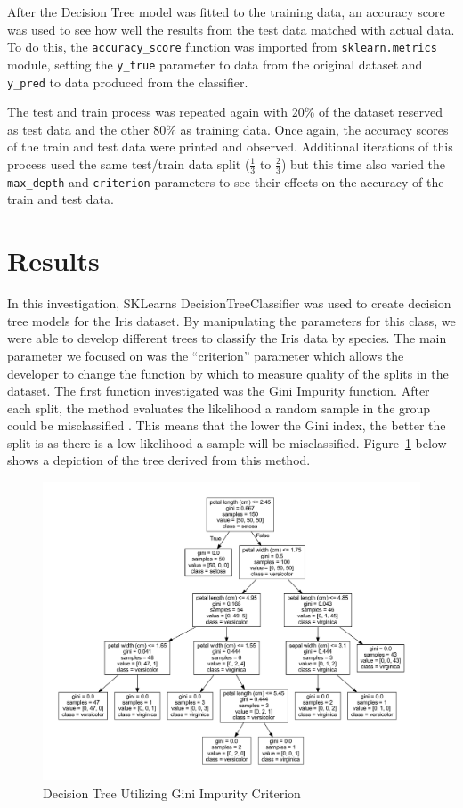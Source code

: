 \documentclass[journal]{IEEEtran}
\begin{document}
After the Decision Tree model was fitted to the training data, an accuracy score was used to see how well the results from the test data matched with actual data. To do this, the \lstinline{accuracy_score} function was imported from \lstinline{sklearn.metrics} module, setting the \lstinline{y_true} parameter to data from the original dataset and \lstinline{y_pred} to data produced from the classifier. 

The test and train process was repeated again with 20\% of the dataset reserved as test data and the other 80\% as training data. Once again, the accuracy scores of the train and test data were printed and observed. Additional iterations of this process used the same test/train data split (\(\frac{1}{3}\) to \(\frac{2}{3}\)) but this time also varied the \lstinline{max_depth} and \lstinline{criterion} parameters to see their effects on the accuracy of the train and test data.

\section{Results}

In this investigation, SKLearn\textquotesingle s DecisionTreeClassifier was used to create decision tree models for the Iris dataset. By manipulating the parameters for this class, we were able to develop different trees to classify the Iris data by species. The main parameter we focused on was the “criterion” parameter which allows the developer to change the function by which to measure quality of the splits in the dataset. The first function investigated was the Gini Impurity function. After each split, the method evaluates the likelihood a random sample in the group could be misclassified \cite{b2}. This means that the lower the Gini index, the better the split is as there is a low likelihood a sample will be misclassified. Figure~\ref{fig:dtGI} below shows a depiction of the tree derived from this method.

\begin{figure}[h!]
\includegraphics[scale=0.25]{iris.pdf}
\centering
\caption{Decision Tree Utilizing Gini Impurity Criterion}
\label{fig:dtGI}
\end{figure}
\end{document}
